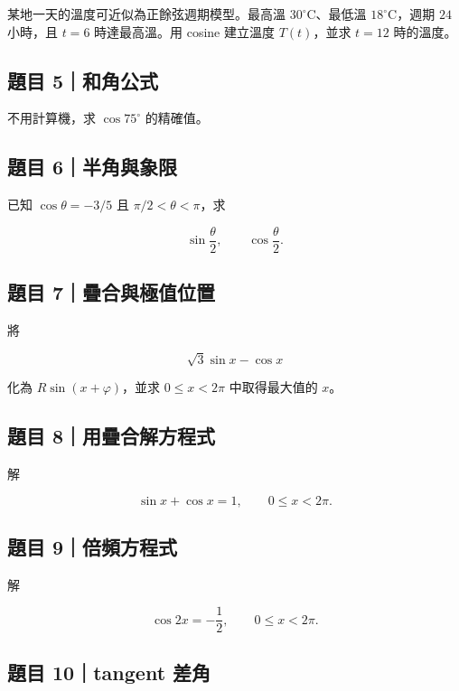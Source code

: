 \documentclass[11pt,a4paper]{article}
\begin{document}
某地一天的溫度可近似為正餘弦週期模型。最高溫 \(30^\circ\mathrm C\)、最低溫 \(18^\circ\mathrm C\)，週期 \(24\) 小時，且 \(t=6\) 時達最高溫。用 cosine 建立溫度 \(T(t)\)，並求 \(t=12\) 時的溫度。

\subsection{題目 5｜和角公式}\label{ux984cux76ee-5ux548cux89d2ux516cux5f0f}

不用計算機，求 \(\cos75^\circ\) 的精確值。

\subsection{題目 6｜半角與象限}\label{ux984cux76ee-6ux534aux89d2ux8207ux8c61ux9650}

已知 \(\cos\theta=-3/5\) 且 \(\pi/2<\theta<\pi\)，求

\[
\sin\frac\theta2,
\qquad
\cos\frac\theta2.
\]

\subsection{題目 7｜疊合與極值位置}\label{ux984cux76ee-7ux758aux5408ux8207ux6975ux503cux4f4dux7f6e}

將

\[
\sqrt3\sin x-\cos x
\]

化為 \(R\sin(x+\varphi)\)，並求 \(0\le x<2\pi\) 中取得最大值的 \(x\)。

\subsection{題目 8｜用疊合解方程式}\label{ux984cux76ee-8ux7528ux758aux5408ux89e3ux65b9ux7a0bux5f0f}

解

\[
\sin x+\cos x=1,
\qquad 0\le x<2\pi.
\]

\subsection{題目 9｜倍頻方程式}\label{ux984cux76ee-9ux500dux983bux65b9ux7a0bux5f0f}

解

\[
\cos2x=-\frac12,
\qquad 0\le x<2\pi.
\]

\subsection{題目 10｜tangent 差角}\label{ux984cux76ee-10tangent-ux5deeux89d2}
\end{document}
